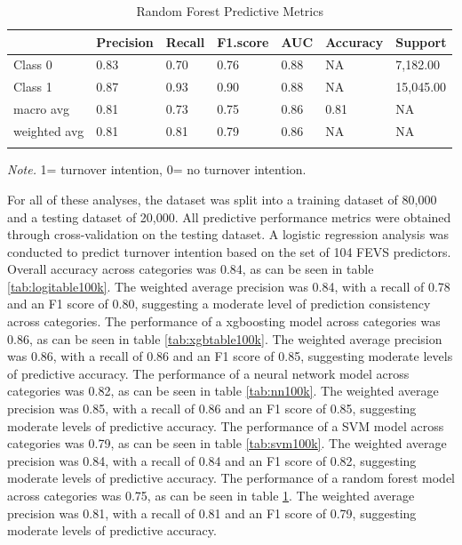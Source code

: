\documentclass[
  man]{apa7}
\begin{document}
\begin{table}[tbp]

\begin{center}
\begin{threeparttable}

\caption{\label{tab:rf100k}Random Forest Predictive Metrics}

\begin{tabular}{lllllll}
\toprule
 & \multicolumn{1}{c}{Precision} & \multicolumn{1}{c}{Recall} & \multicolumn{1}{c}{F1.score} & \multicolumn{1}{c}{AUC} & \multicolumn{1}{c}{Accuracy} & \multicolumn{1}{c}{Support}\\
\midrule
Class 0 & 0.83 & 0.70 & 0.76 & 0.88 & NA & 7,182.00\\
Class 1 & 0.87 & 0.93 & 0.90 & 0.88 & NA & 15,045.00\\
macro avg & 0.81 & 0.73 & 0.75 & 0.86 & 0.81 & NA\\
weighted avg & 0.81 & 0.81 & 0.79 & 0.86 & NA & NA\\
\bottomrule
\addlinespace
\end{tabular}

\begin{tablenotes}[para]
\normalsize{\textit{Note.} 1= turnover intention, 0= no turnover intention.}
\end{tablenotes}

\end{threeparttable}
\end{center}

\end{table}

For all of these analyses, the dataset was split into a training dataset of 80,000 and a testing dataset of 20,000. All predictive performance metrics were obtained through cross-validation on the testing dataset. A logistic regression analysis was conducted to predict turnover intention based on the set of 104 FEVS predictors. Overall accuracy across categories was 0.84, as can be seen in table \ref{tab:logitable100k}. The weighted average precision was 0.84, with a recall of 0.78 and an F1 score of 0.80, suggesting a moderate level of prediction consistency across categories.
The performance of a xgboosting model across categories was 0.86, as can be seen in table \ref{tab:xgbtable100k}. The weighted average precision was 0.86, with a recall of 0.86 and an F1 score of 0.85, suggesting moderate levels of predictive accuracy.
The performance of a neural network model across categories was 0.82, as can be seen in table \ref{tab:nn100k}. The weighted average precision was 0.85, with a recall of 0.86 and an F1 score of 0.85, suggesting moderate levels of predictive accuracy.
The performance of a SVM model across categories was 0.79, as can be seen in table \ref{tab:svm100k}. The weighted average precision was 0.84, with a recall of 0.84 and an F1 score of 0.82, suggesting moderate levels of predictive accuracy.
The performance of a random forest model across categories was 0.75, as can be seen in table \ref{tab:rf100k}. The weighted average precision was 0.81, with a recall of 0.81 and an F1 score of 0.79, suggesting moderate levels of predictive accuracy.
\end{document}
